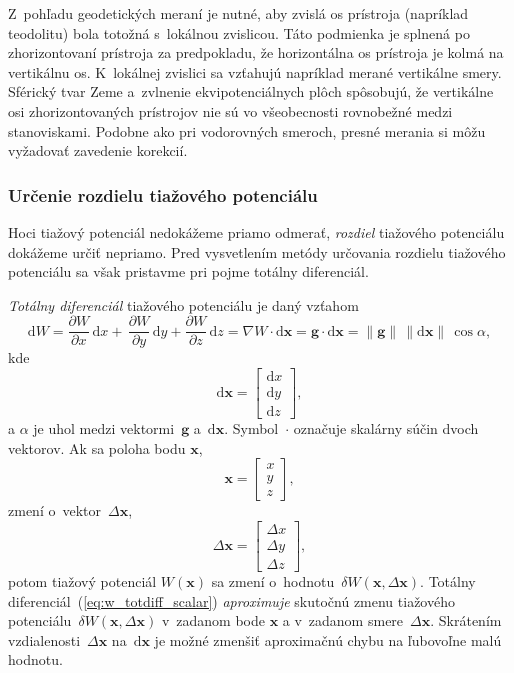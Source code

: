 \documentclass[a4paper,12pt]{book}
\newcommand{\diff}{\mathrm d}
\let\vec\mathbf
\begin{document}
Z~pohľadu geodetických meraní je nutné, aby zvislá os prístroja (napríklad
teodolitu) bola totožná s~lokálnou zvislicou.  Táto podmienka je splnená po
zhorizontovaní prístroja za predpokladu, že horizontálna os prístroja je kolmá
na vertikálnu os.  K~lokálnej zvislici sa vzťahujú napríklad merané
vertikálne smery.  Sférický tvar Zeme a~zvlnenie ekvipotenciálnych plôch
spôsobujú, že vertikálne osi zhorizontovaných prístrojov nie sú vo všeobecnosti
rovnobežné medzi stanoviskami.  Podobne ako pri vodorovných smeroch, presné
merania si môžu vyžadovať zavedenie korekcií.

\subsubsection{Určenie rozdielu tiažového potenciálu}

Hoci tiažový potenciál nedokážeme priamo odmerať, \emph{rozdiel} tiažového 
potenciálu dokážeme určiť nepriamo.  Pred vysvetlením metódy určovania rozdielu 
tiažového potenciálu sa však pristavme pri pojme totálny diferenciál.

\emph{Totálny diferenciál} tiažového potenciálu je daný vzťahom 
\parencite{MoritzPhysicalGeodesy}
%
\begin{equation}
\label{eq:w_totdiff_scalar}
\diff W = \frac{\partial W}{\partial x} \, \diff x + \, \frac{\partial 
W}{\partial y} \, \diff y + \frac{\partial W}{\partial z} \, \diff z = \nabla 
W \cdot \diff \vec x = \vec g \cdot \diff \vec x = \| \vec g \| \, \| \diff 
\vec x \| \, \cos\alpha{,}
\end{equation}
%
kde
%
\begin{equation}
\diff \vec x =
\begin{bmatrix}
\diff x\\
\diff y\\
\diff z
\end{bmatrix}
{,}
\end{equation}
%
a $\alpha$ je uhol medzi vektormi~$\vec g$ a~$\diff \vec x$.  Symbol~$\cdot$ 
označuje skalárny súčin dvoch vektorov.  Ak sa poloha bodu $\vec x$,
%
\begin{equation}
\vec x =
\begin{bmatrix}
x\\
y\\
z
\end{bmatrix}
{,}
\end{equation}
%
zmení o~vektor~$\Delta \vec x$,
%
\begin{equation}
\Delta \vec x =
\begin{bmatrix}
\Delta x\\
\Delta y\\
\Delta z
\end{bmatrix}
{,}
\end{equation}
%
potom tiažový potenciál $W(\vec x)$ sa zmení o~hodnotu~$\delta W(\vec x, \Delta 
\vec x)$.  Totálny diferenciál~(\ref{eq:w_totdiff_scalar}) \emph{aproximuje} 
skutočnú zmenu tiažového potenciálu~$\delta W(\vec x, \Delta \vec x)$ v~zadanom 
bode $\vec x$ a v~zadanom smere~$\Delta \vec x$.  Skrátením 
vzdialenosti~$\Delta \vec x$ na~$\diff \vec x$ je možné zmenšiť aproximačnú 
chybu na ľubovoľne malú hodnotu.
\end{document}
